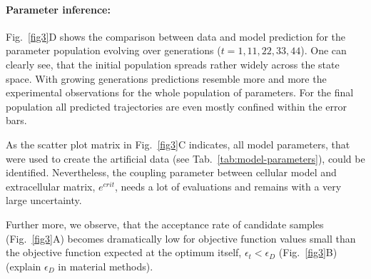 \documentclass[10pt,letterpaper]{article}
\newcommand{\nj}[1]{{\color{blue}#1}}
\begin{document}

\paragraph{Parameter inference:}

Fig.~\ref{fig3}D shows the comparison between data and model prediction for the parameter population evolving over generations ($t=1,11,22,33,44$). One can clearly see, that the initial population spreads rather widely across the state space. With growing generations predictions resemble more and more the experimental observations for the whole population of parameters. For the final population all predicted trajectories are even mostly confined within the error bars.

As the scatter plot matrix in Fig.~\ref{fig3}C indicates, all model parameters, that were used to create the artificial data (see Tab.~\ref{tab:model-parameters}), could be identified. Nevertheless, the coupling parameter between cellular model and extracellular matrix, $e^{crit}$, needs a lot of evaluations and remains with a very large uncertainty. 

Further more, we observe, that the acceptance rate of candidate samples (Fig.~\ref{fig3}A) becomes dramatically low for objective function values small than the objective function expected at the optimum itself, $\epsilon_{t} < \epsilon_{D}$ (Fig.~\ref{fig3}B) \nj{(explain $\epsilon_{D}$ in material methods)}.
\end{document}
